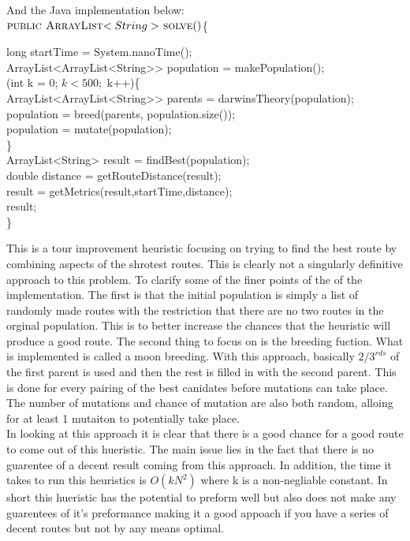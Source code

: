 \documentclass[midd]{thesis}
\newcommand{\tab}{\hspace*{2em}}
\begin{document}
And the Java implementation below:\\
$\textnormal{\scshape public ArrayList$<String>$ solve}()$\{
\begin{codebox}
long startTime = System.nanoTime();\\
\tab ArrayList<ArrayList<String>> population =  makePopulation();\\
\tab\For(int k = 0; $k < 500;$ k++)\{\\
\tab\tab ArrayList<ArrayList<String>> parents = darwinsTheory(population);\\
\tab\tab population = breed(parents, population.size());\\
\tab\tab population =  mutate(population);\End\\
\tab\}\\
\tab ArrayList<String> result = findBest(population);\\
\tab double distance = getRouteDistance(result);\\
\tab result = getMetrics(result,startTime,distance);\\
\Return result;\\
\}\\
\end{codebox}
\tab This is a tour improvement heuristic focusing on trying to find the best route by combining aspects of the shrotest routes. This is clearly not a singularly definitive approach to this problem. To clarify some of the finer points of the of the implementation. The first is that the initial population is simply a list of randomly made routes with the restriction that there are no two routes in the orginal population. This is to better increase the chances that the heuristic will produce a good route. The second thing to focus on is the breeding fuction. What is implemented is called a moon breeding. With this approach, basically $2/3^{rds}$ of the first parent is used and then the rest is filled in with the second parent. This is done for every pairing of the best canidates before mutations can take place. The number of mutations and chance of mutation are also both random, alloing for at least 1 mutaiton to potentially take place.\\
\tab In looking at this approach it is clear that there is a good chance for a good route to come out of this hueristic. The main issue lies in the fact that there is no guarentee of a decent result coming from this approach. In addition, the time it takes to run this heuristics is $O(kN^2)$ where k is a non-negliable constant. In short this hueristic has the potential to preform well but also does not make any guarentees of it's preformance making it a good appoach if you have a series of decent routes but not by any means optimal.
\end{document}
